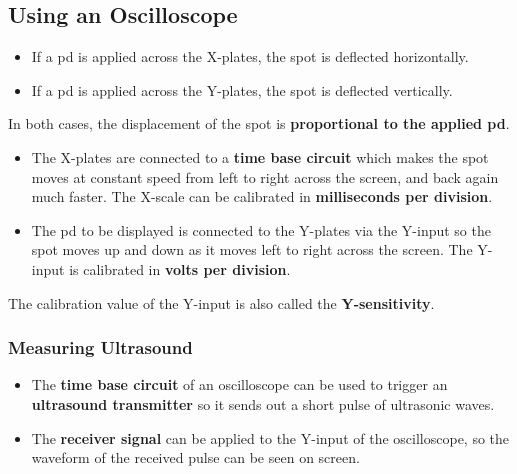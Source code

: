 \subsection{Using an Oscilloscope}

\begin{itemize}
    \item If a pd is applied across the X-plates, the spot is deflected horizontally.
    \item If a pd is applied across the Y-plates, the spot is deflected vertically.
\end{itemize}
In both cases, the displacement of the spot is \textbf{proportional to the applied pd}.

\begin{itemize}
    \item The X-plates are connected to a \textbf{time base circuit} which makes the spot moves at constant speed from left to right across the screen, and back again much faster. The X-scale can be calibrated in \textbf{milliseconds per division}.
    \item The pd to be displayed is connected to the Y-plates via the Y-input so the spot moves up and down as it moves left to right across the screen. The Y-input is calibrated in \textbf{volts per division}.
\end{itemize}
The calibration value of the Y-input is also called the \textbf{Y-sensitivity}.

\subsubsection*{Measuring Ultrasound}

\begin{itemize}
    \item The \textbf{time base circuit} of an oscilloscope can be used to trigger an \textbf{ultrasound transmitter} so it sends out a short pulse of ultrasonic waves.
    \item The \textbf{receiver signal} can be applied to the Y-input of the oscilloscope, so the waveform of the received pulse can be seen on screen.
\end{itemize}
